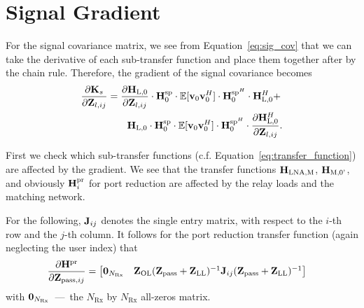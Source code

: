 \section{Signal Gradient}
\label{sec:signal_gradient}
 For the signal covariance matrix, we see from Equation~\eqref{eq:sig_cov} that we can take the derivative of each sub-transfer function and place them together after by the chain rule. 
Therefore, the gradient of the signal covariance becomes
\begin{align}
\label{eq:signal_gradient}\nonumber
\frac{\partial\mathbf{K}_s}{\partial\mathbf{Z}_{l,ij}} &= \frac{\partial\mathbf{H}_\text{L,0}}{\partial\mathbf{Z}_{l,ij}}\cdot \mathbf{H}_{0}^{\text{sp}}
	\cdot\mathbb{E}[\mathbf{v}_0\mathbf{v}_0^H]\cdot
	\mathbf{H}_{0}^{\text{sp}^H} \cdot \mathbf{H}_\text{L,0}^H + \\
&\qquad	\mathbf{H}_\text{L,0}\cdot \mathbf{H}_{0}^{\text{sp}}
	\cdot\mathbb{E}[\mathbf{v}_0\mathbf{v}_0^H]\cdot
	\mathbf{H}_{0}^{\text{sp}^H} \cdot \frac{\partial\mathbf{H}_\text{L,0}^H }{\partial\mathbf{Z}_{l,ij}}.
\end{align}

First we check which sub-transfer functions (c.f. Equation~\eqref{eq:transfer_function}) are affected by the gradient.
We see that the transfer functions $\mathbf{H}_\text{LNA,M}$, $\mathbf{H}_\text{M,0'}$, and obviously $\mathbf{H}_i^{\text{pr}}$ for port reduction are affected by the relay loads and the matching network.

For the following, $\mathbf{J}_{ij}$ denotes the single entry matrix, with respect to the $i$-th row and the $j$-th column.
It follows for the port reduction transfer function (again neglecting the user index) that
\begin{align}
\label{eq:H0_sig_grad}
\frac{\partial\mathbf{H}^{\text{pr}}}{\partial\mathbf{Z}_{\text{pass},ij}}&=
\begin{bmatrix}
\mathbf{0}_{N_\text{Rx}} & \mathbf{Z}_\text{OL}(\mathbf{Z}_\text{pass}+\mathbf{Z}_\text{LL})^{-1}\mathbf{J}_{ij}(\mathbf{Z}_{\text{pass}}+\mathbf{Z}_\text{LL})^{-1}
\end{bmatrix}
\end{align}
with $\mathbf{0}_{N_\text{Rx}}$~---~the ${N_\text{Rx}}$ by ${N_\text{Rx}}$ all-zeros matrix.

